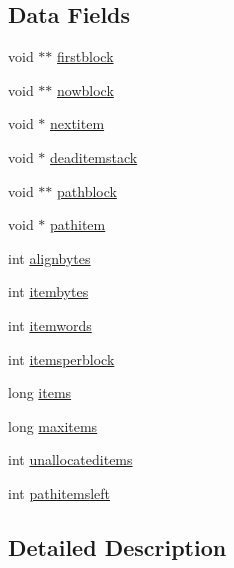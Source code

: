\subsection*{Data Fields}
\begin{DoxyCompactItemize}
\item 
void $\ast$$\ast$ \hyperlink{classtetgenmesh_1_1memorypool_a5a00ffcfb581ef96fb53c995b25838ee}{firstblock}
\item 
void $\ast$$\ast$ \hyperlink{classtetgenmesh_1_1memorypool_a63e80bcff81323ea491bfa189c15879b}{nowblock}
\item 
void $\ast$ \hyperlink{classtetgenmesh_1_1memorypool_ab0864200773e9371db60d190fb0c3cf7}{nextitem}
\item 
void $\ast$ \hyperlink{classtetgenmesh_1_1memorypool_a5979100eaabf64ef2179a259e3adf0b7}{deaditemstack}
\item 
void $\ast$$\ast$ \hyperlink{classtetgenmesh_1_1memorypool_a6830e3c672f7a7546c2ea0ed70b2ac38}{pathblock}
\item 
void $\ast$ \hyperlink{classtetgenmesh_1_1memorypool_a216794c50c477f54c516ca4fad023df1}{pathitem}
\item 
int \hyperlink{classtetgenmesh_1_1memorypool_a83ede6da644205f50ae359dc633a92a5}{alignbytes}
\item 
int \hyperlink{classtetgenmesh_1_1memorypool_adadcd6a22bbdd129b29e1a7a3cc4de43}{itembytes}
\item 
int \hyperlink{classtetgenmesh_1_1memorypool_a11a5e52e6559d7fcd95de844d69a37a4}{itemwords}
\item 
int \hyperlink{classtetgenmesh_1_1memorypool_a06ef9dbd1dec025a8c0475aaac348d3a}{itemsperblock}
\item 
long \hyperlink{classtetgenmesh_1_1memorypool_af29a38b2654a8d977dd24eea8dc72729}{items}
\item 
long \hyperlink{classtetgenmesh_1_1memorypool_ae9dda5bafe91eed206b26fa7d7020716}{maxitems}
\item 
int \hyperlink{classtetgenmesh_1_1memorypool_aa8a5667ab1f55ec7ef852d378871b9ee}{unallocateditems}
\item 
int \hyperlink{classtetgenmesh_1_1memorypool_ad83a51d49f6e03ff38151b870a2f51dd}{pathitemsleft}
\end{DoxyCompactItemize}


\subsection{Detailed Description}


